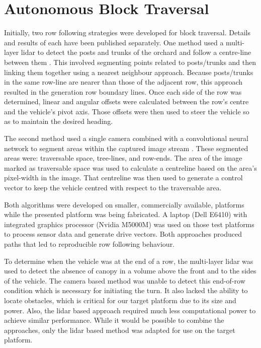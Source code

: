\documentclass[preprint,authoryear,12pt]{elsarticle}
\begin{document}
\section{Autonomous Block Traversal}
\label{sect:autonomous}
    Initially, two row following strategies were developed for block traversal.
    Details and results of each have been published separately.
    One method used a multi-layer lidar to detect the posts and trunks of the orchard and follow a centre-line between them \citep{Bell2016}.
    This involved segmenting points related to posts/trunks and then linking them together using a nearest neighbour approach.
    Because posts/trunks in the same row-line are nearer than those of the adjacent row, this approach resulted in the generation row boundary lines.
    Once each side of the row was determined, linear and angular offsets were calculated between the row's centre and the vehicle's pivot axis.
    Those offsets were then used to steer the vehicle so as to maintain the desired heading.

    The second method used a single camera combined with a convolutional neural network to segment areas within the captured image stream \citep{Bell2017}.
    These segmented areas were: traversable space, tree-lines, and row-ends.
    The area of the image marked as traversable space was used to calculate a centreline based on the area's pixel-width in the image.
    That centreline was then used to generate a control vector to keep the vehicle centred with respect to the traversable area.

    Both algorithms were developed on smaller, commercially available, platforms while the presented platform was being fabricated.
    A laptop (Dell E6410) with integrated graphics processor (Nvidia M5000M) was used on those test platforms to process sensor data and generate drive vectors.
    Both approaches produced paths that led to reproducible row following behaviour.

    To determine when the vehicle was at the end of a row, the multi-layer lidar was used to detect the absence of canopy in a volume above the front and to the sides of the vehicle.
    The camera based method was unable to detect this end-of-row condition which is necessary for initiating the turn.
    It also lacked the ability to locate obstacles, which is critical for our target platform due to its size and power.
    Also, the lidar based approach required much less computational power to achieve similar performance.
    While it would be possible to combine the approaches, only the lidar based method was adapted for use on the target platform.
\end{document}
